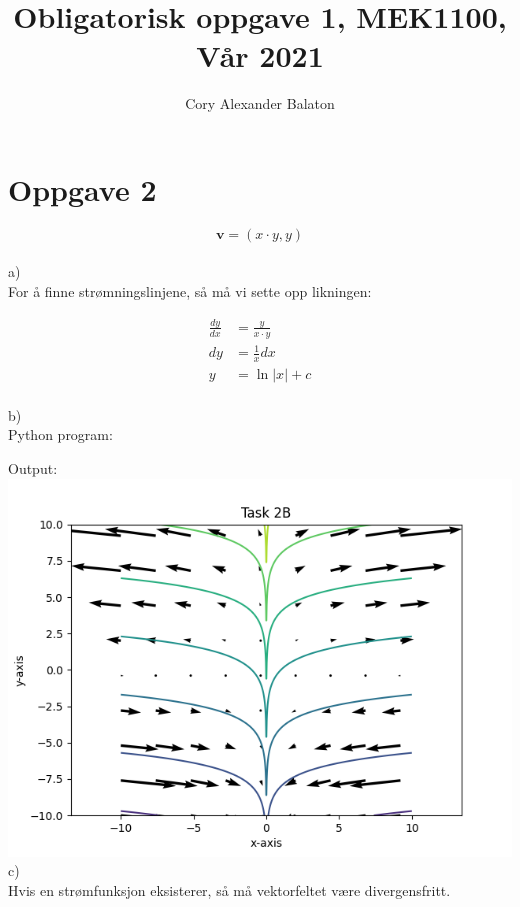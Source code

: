 \documentclass[12pt, a4paper]{article}
\title{Obligatorisk oppgave 1, MEK1100, Vår 2021}
\author{Cory Alexander Balaton}
\date{}
\begin{document}
\maketitle 
\newpage

\section*{Oppgave 2}

\begin{equation}
    \textbf{v} = (x \cdot y, y)
\end{equation}
\\
a) \\
For å finne strømningslinjene, så må vi sette opp likningen:

\begin{equation}
    \begin{split}
        \frac{dy}{dx} &= \frac{y}{x \cdot y} \\
                   dy &= \frac{1}{x} dx \\
                    y &= \ln|x| + c
    \end{split}
\end{equation}
\\
b) \\



\newpage
Python program:


\newpage
Output: \\
\hspace*{-1.5cm}
\includegraphics{two_b}
\\
c) \\
Hvis en strømfunksjon eksisterer, så må vektorfeltet være divergensfritt.
\end{document}
